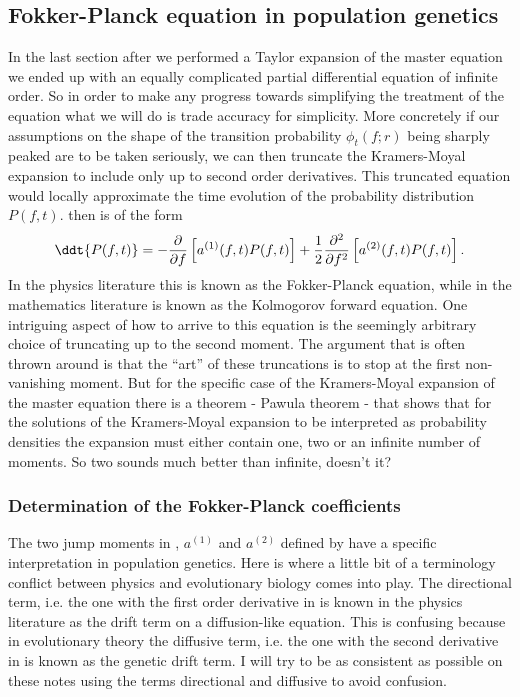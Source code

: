 \subsection{Fokker-Planck equation in population genetics}

In the last section after we performed a Taylor expansion of the master
equation we ended up with an equally complicated partial differential equation
of infinite order. So in order to make any progress towards simplifying the
treatment of the equation what we will do is trade accuracy for simplicity.
More concretely if our assumptions on the shape of the transition probability
$\phi_t(f; r)$ being sharply peaked are to be taken seriously, we can then
truncate the Kramers-Moyal expansion to include only up to second order
derivatives. This truncated equation would locally approximate the time
evolution of the probability distribution $P(f, t)$. 
then is of the form
\begin{equation}
  \ddt{P(f, t)} = - {\partial \over \partial f}
  \left[
  a^{(1)}(f, t) P(f, t)
  \right] +
  {1 \over 2}{\partial^2 \over \partial f^2}
  \left[
  a^{(2)}(f, t) P(f, t)
  \right].
  \label{eq_fokker_planck}
\end{equation}
In the physics literature this is known as the Fokker-Planck equation, while in
the mathematics literature is known as the Kolmogorov forward equation. One
intriguing aspect of how to arrive to this equation is the seemingly arbitrary
choice of truncating up to the second moment. The argument that is often thrown
around is that the ``art'' of these truncations is to stop at the first
non-vanishing moment. But for the specific case of the Kramers-Moyal expansion
of the master equation there is a theorem - Pawula theorem - that shows that
for the solutions of the Kramers-Moyal expansion to be interpreted as
probability densities the expansion must either contain one, two or an infinite
number of moments. So two sounds much better than infinite, doesn't it?

\subsubsection{Determination of the Fokker-Planck coefficients}

The two jump moments in , $a^{(1)}$ and $a^{(2)}$
defined by  have a specific interpretation in population
genetics. Here is where a little bit of a terminology conflict between physics
and evolutionary biology comes into play. The directional term, i.e. the one
with the first order derivative in  is known in the
physics literature as the drift term on a diffusion-like equation. This is
confusing because in evolutionary theory the diffusive term, i.e. the one with
the second derivative in  is known as the genetic drift
term. I will try to be as consistent as possible on these notes using the terms
directional and diffusive to avoid confusion.

